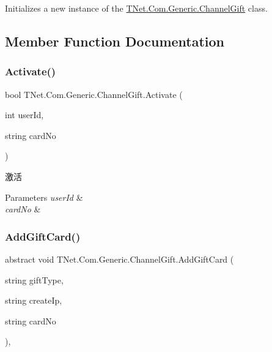 Initializes a new instance of the \mbox{\hyperlink{class_t_net_1_1_com_1_1_generic_1_1_channel_gift}{T\+Net.\+Com.\+Generic.\+Channel\+Gift}} class. 



\subsection{Member Function Documentation}
\mbox{\label{class_t_net_1_1_com_1_1_generic_1_1_channel_gift_a6d0dcd4d38cb6f36256cd8268c83f3ba}} 
\subsubsection{\texorpdfstring{Activate()}{Activate()}}
{\footnotesize\ttfamily bool T\+Net.\+Com.\+Generic.\+Channel\+Gift.\+Activate (\begin{DoxyParamCaption}\item[{int}]{user\+Id,  }\item[{string}]{card\+No }\end{DoxyParamCaption})}



激活 


\begin{DoxyParams}{Parameters}
{\em user\+Id} & \\
\hline
{\em card\+No} & \\
\hline
\end{DoxyParams}
\mbox{\label{class_t_net_1_1_com_1_1_generic_1_1_channel_gift_aedb6603b56402c2094c4645be1cb3e63}} 
\subsubsection{\texorpdfstring{Add\+Gift\+Card()}{AddGiftCard()}}
{\footnotesize\ttfamily abstract void T\+Net.\+Com.\+Generic.\+Channel\+Gift.\+Add\+Gift\+Card (\begin{DoxyParamCaption}\item[{string}]{gift\+Type,  }\item[{string}]{create\+Ip,  }\item[{string}]{card\+No }\end{DoxyParamCaption})\hspace{0.3cm}{\ttfamily [protected]}, {}}



